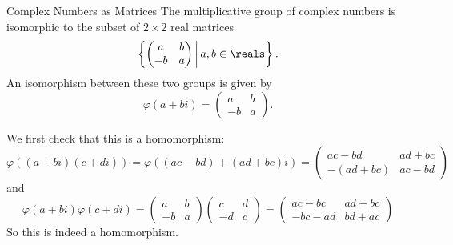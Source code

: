 \documentclass[fleqn]{NotesClass}
\begin{document}
    \begin{exm}{Complex Numbers as Matrices}{}
        The multiplicative group of complex numbers is isomorphic to the subset of \(2\times 2\) real matrices
        \begin{equation}
            \left\{ 
            \begin{pmatrix}
                a & b\\
                -b & a
            \end{pmatrix}
            \,\middle\vert \, a, b \in \reals \right\}.
        \end{equation}
        An isomorphism between these two groups is given by
        \begin{equation}
            \varphi(a + bi) = 
            \begin{pmatrix}
                a & b\\
                -b & a
            \end{pmatrix}
            .
        \end{equation}
        
        We first check that this is a homomorphism:
        \begin{equation}
            \varphi((a + bi)(c + di)) = 
            \varphi((ac - bd) + (ad + bc)i) = 
            \begin{pmatrix}
                ac - bd & ad + bc\\
                -(ad + bc) & ac - bd
            \end{pmatrix}
        \end{equation}
        and
        \begin{equation}
            \varphi(a + bi)\varphi(c + di) = 
            \begin{pmatrix}
                a & b\\
                -b & a
            \end{pmatrix}
            \begin{pmatrix}
                c & d\\
                -d & c
            \end{pmatrix}
            =
            \begin{pmatrix}
                ac - bc & ad + bc\\
                -bc - ad & bd + ac
            \end{pmatrix}
        \end{equation}
        So this is indeed a homomorphism.
        

\end{exm}
\end{document}
